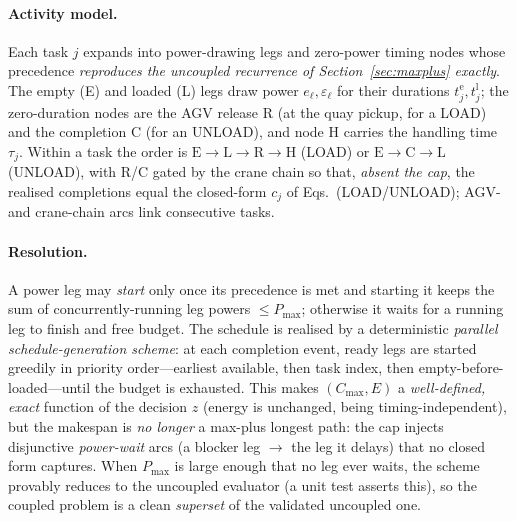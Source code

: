 \documentclass[11pt]{article}
\newcommand{\Cmax}{C_{\max}}
\begin{document}
\paragraph{Activity model.} Each task $j$ expands into power-drawing legs and zero-power
timing nodes whose precedence \emph{reproduces the uncoupled recurrence of
Section~\ref{sec:maxplus} exactly}. The empty (E) and loaded (L) legs draw power
$e_\ell,\varepsilon_\ell$ for their durations $t^{\mathrm e}_j,t^{\mathrm l}_j$; the
zero-duration nodes are the AGV release R (at the quay pickup, for a LOAD) and the completion
C (for an UNLOAD), and node H carries the handling time $\tau_j$. Within a task the order is
$\mathrm{E}\!\to\!\mathrm{L}\!\to\!\mathrm{R}\!\to\!\mathrm{H}$ (LOAD) or
$\mathrm{E}\!\to\!\mathrm{C}\!\to\!\mathrm{L}$ (UNLOAD), with R/C gated by the crane chain so
that, \emph{absent the cap}, the realised completions equal the closed-form $c_j$ of
Eqs.~(LOAD/UNLOAD); AGV- and crane-chain arcs link consecutive tasks.

\paragraph{Resolution.} A power leg may \emph{start} only once its precedence is met
and starting it keeps the sum of concurrently-running leg powers $\le P_{\max}$;
otherwise it waits for a running leg to finish and free budget. The schedule is realised by a
deterministic \emph{parallel schedule-generation scheme}: at each completion event, ready legs
are started greedily in priority order---earliest available, then task index, then
empty-before-loaded---until the budget is exhausted. This makes $(\Cmax,E)$ a
\emph{well-defined, exact} function of the decision $z$ (energy is unchanged, being
timing-independent), but the makespan is \emph{no longer} a max-plus longest path: the cap
injects disjunctive \emph{power-wait} arcs (a blocker leg $\to$ the leg it delays) that no
closed form captures. When $P_{\max}$ is large enough that no leg ever waits, the scheme
provably reduces to the uncoupled evaluator (a unit test asserts this), so the coupled problem
is a clean \emph{superset} of the validated uncoupled one.
\end{document}
